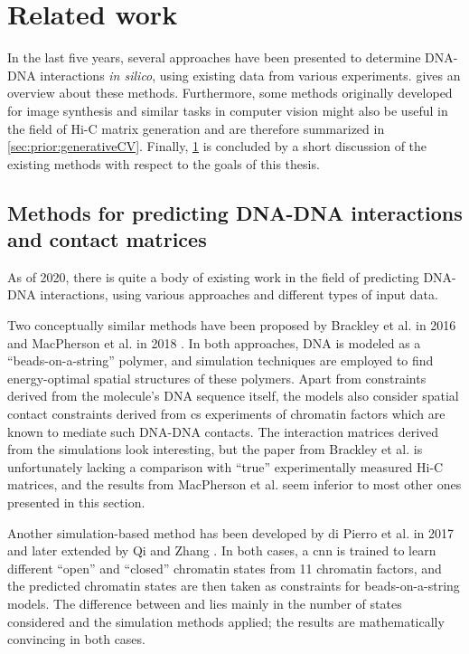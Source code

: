 \section{Related work}\label{sec:prior:relatedWork}
In the last five years, several approaches have been presented to determine DNA-DNA interactions \emph{in silico}, 
using existing data from various experiments.  gives an overview about these methods.
Furthermore, some methods originally developed for image synthesis and similar tasks in computer vision might also be useful 
in the field of Hi-C matrix generation and are therefore summarized in \autoref{sec:prior:generativeCV}.
Finally, \cref{sec:prior:relatedWork} is concluded by a short discussion of the existing methods with respect to the goals of this thesis.

\subsection{Methods for predicting DNA-DNA interactions and contact matrices} \label{sec:prior:predictingInteractions}
As of 2020, there is quite a body of existing work in the field of predicting DNA-DNA interactions, 
using various approaches and different types of input data.

Two conceptually similar methods have been proposed by Brackley et al. in 2016 \cite{Brackley2016} and MacPherson et al. in 2018 \cite{MacPherson2018}.
In both approaches, DNA is modeled as a ``beads-on-a-string'' polymer, and simulation techniques are employed to
find energy-optimal spatial structures of these polymers.
Apart from constraints derived from the molecule's DNA sequence itself, the models also consider spatial contact constraints derived from \acrshort{cs} experiments
of chromatin factors which are known to mediate such DNA-DNA contacts.
The interaction matrices derived from the simulations look interesting, 
but the paper from Brackley et al. \cite{Brackley2016} is unfortunately lacking a comparison with ``true'' experimentally measured Hi-C matrices, 
and the results from MacPherson et al. \cite{MacPherson2018} seem inferior to most other ones presented in this section.

Another simulation-based method has been developed by di Pierro et al. in 2017 \cite{Pierro2017} and later extended by Qi and Zhang \cite{Qi2019}. 
In both cases, a \acrfull{cnn} is trained to learn different ``open'' and ``closed'' chromatin states from 11 chromatin factors, 
and the predicted chromatin states are then taken as constraints for beads-on-a-string models.
The difference between \cite{Pierro2017} and \cite{Qi2019} lies mainly in the number of states considered and the simulation methods applied;
the results are mathematically convincing in both cases.

